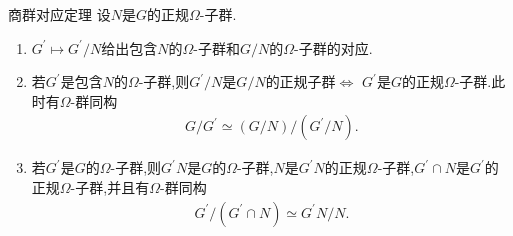 \begin{theorem}{商群对应定理}{}
	设$N$是$G$的正规$\Omega$-子群.
	\begin{enumerate}
		\item $G^{\prime}\mapsto G^{\prime}/N$给出包含$N$的$\Omega$-子群和$G/N$的$\Omega$-子群的对应.
		\item 若$G^{\prime}$是包含$N$的$\Omega$-子群,则$G^{\prime}/N$是$G/N$的正规子群$\iff$ $G^{\prime}$是$G$的正规$\Omega$-子群.此时有$\Omega$-群同构
		\begin{align*}
			G/G^{\prime}\simeq\left(G/N\right)/\left(G^{\prime}/N\right).
		\end{align*}
		\item 若$G^{\prime}$是$G$的$\Omega$-子群,则$G^{\prime}N$是$G$的$\Omega$-子群,$N$是$G^{\prime}N$的正规$\Omega$-子群,$G^{\prime}\cap N$是$G^{\prime}$的正规$\Omega$-子群,并且有$\Omega$-群同构
		\begin{align*}
			G^{\prime}/\left(G^{\prime}\cap N\right)\simeq G^{\prime}N/N.
		\end{align*}
	\end{enumerate}
\end{theorem}












































